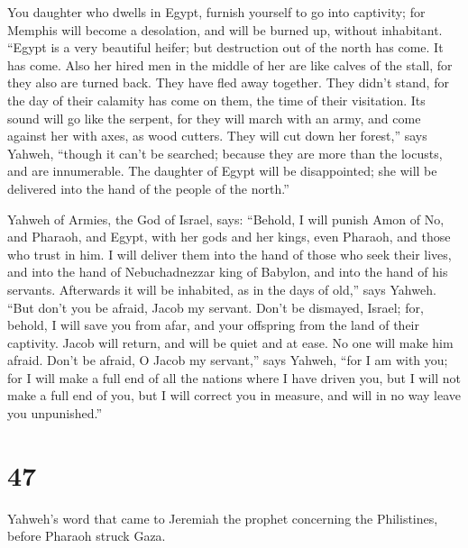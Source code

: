  You daughter who dwells in Egypt, furnish yourself to go
into captivity; for Memphis will become a desolation, and will be burned
up, without inhabitant.  ``Egypt is a very beautiful
heifer; but destruction out of the north has come. It has come.
 Also her hired men in the middle of her are like calves of
the stall, for they also are turned back. They have fled away together.
They didn't stand, for the day of their calamity has come on them, the
time of their visitation.  Its sound will go like the
serpent, for they will march with an army, and come against her with
axes, as wood cutters.  They will cut down her forest,''
says Yahweh, ``though it can't be searched; because they are more than
the locusts, and are innumerable.  The daughter of Egypt
will be disappointed; she will be delivered into the hand of the people
of the north.''

 Yahweh of Armies, the God of Israel, says: ``Behold, I
will punish Amon of No, and Pharaoh, and Egypt, with her gods and her
kings, even Pharaoh, and those who trust in him.  I will
deliver them into the hand of those who seek their lives, and into the
hand of Nebuchadnezzar king of Babylon, and into the hand of his
servants. Afterwards it will be inhabited, as in the days of old,'' says
Yahweh.  ``But don't you be afraid, Jacob my servant. Don't
be dismayed, Israel; for, behold, I will save you from afar, and your
offspring from the land of their captivity. Jacob will return, and will
be quiet and at ease. No one will make him afraid.  Don't
be afraid, O Jacob my servant,'' says Yahweh, ``for I am with you; for I
will make a full end of all the nations where I have driven you, but I
will not make a full end of you, but I will correct you in measure, and
will in no way leave you unpunished.''

\hypertarget{section-46}{%
\section{47}\label{section-46}}

 Yahweh's word that came to Jeremiah the prophet concerning
the Philistines, before Pharaoh struck Gaza.

